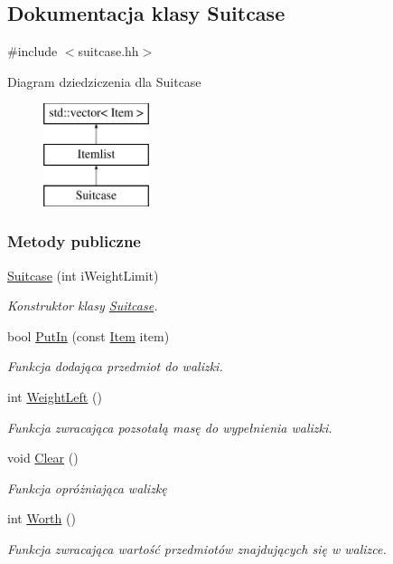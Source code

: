 \hypertarget{class_suitcase}{\subsection{Dokumentacja klasy Suitcase}
\label{class_suitcase}
}


{\ttfamily \#include $<$suitcase.\-hh$>$}

Diagram dziedziczenia dla Suitcase\begin{figure}[H]
\begin{center}
\leavevmode
\includegraphics[height=3.000000cm]{class_suitcase}
\end{center}
\end{figure}
\subsubsection*{Metody publiczne}
\begin{DoxyCompactItemize}
\item 
\hyperlink{class_suitcase_a26538ae7fc5924073ccd21981c4e2ee3}{Suitcase} (int i\-Weight\-Limit)
\begin{DoxyCompactList}\small\item\em Konstruktor klasy \hyperlink{class_suitcase}{Suitcase}. \end{DoxyCompactList}\item 
bool \hyperlink{class_suitcase_af79ee9b926fd7043d67cf8d80d872371}{Put\-In} (const \hyperlink{class_item}{Item} item)
\begin{DoxyCompactList}\small\item\em Funkcja dodająca przedmiot do walizki. \end{DoxyCompactList}\item 
int \hyperlink{class_suitcase_a7b48ae73ae1f9a08a9c17d0a1df02bd6}{Weight\-Left} ()
\begin{DoxyCompactList}\small\item\em Funkcja zwracająca pozsotałą masę do wypełnienia walizki. \end{DoxyCompactList}\item 
void \hyperlink{class_suitcase_ad671edca529a637145bfa2de1f491373}{Clear} ()
\begin{DoxyCompactList}\small\item\em Funkcja opróżniająca walizkę \end{DoxyCompactList}\item 
int \hyperlink{class_suitcase_a7a35f87239170b275518f2e4211fbbb7}{Worth} ()
\begin{DoxyCompactList}\small\item\em Funkcja zwracająca wartość przedmiotów znajdujących się w walizce. \end{DoxyCompactList}\end{DoxyCompactItemize}
